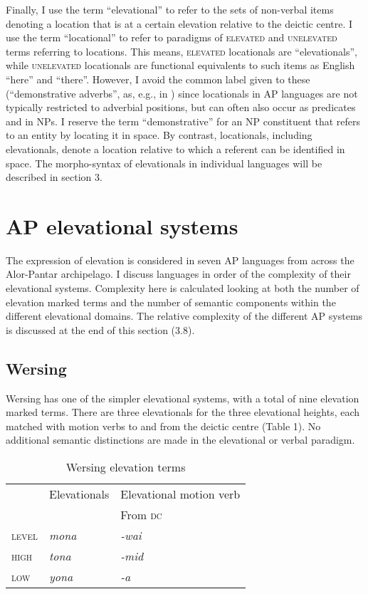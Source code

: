 Finally, I use the term ``elevational'' to refer to the sets of non-verbal items denoting a location that is at a certain elevation relative to the deictic centre. I use the term ``locational'' to refer to paradigms of \textsc{elevated} and \textsc{unelevated} terms referring to locations. This means, \textsc{elevated} locationals are ``elevationals'', while \textsc{unelevated} locationals are functional equivalents to such items as English ``here'' and ``there''. However, I avoid the common label given to these (``demonstrative adverbs'', as, e.g., in \citet{Diessel1999}) since locationals in AP languages are not typically restricted to adverbial positions, but can often also occur as predicates and in NPs. I reserve the term ``demonstrative'' for an NP constituent that refers to an entity by locating it in space. By contrast, locationals, including elevationals, denote a location relative to which a referent can be identified in space. The morpho-syntax of elevationals in individual languages will be described in section 3.

\section{AP elevational systems}
The expression of elevation is considered in seven AP languages from across the Alor-Pantar archipelago. I discuss languages in order of the complexity of their elevational systems. Complexity here is calculated looking at both the number of elevation marked terms and the number of semantic components within the different elevational domains. The relative complexity of the different AP systems is discussed at the end of this section (3.8).

\subsection{Wersing}
Wersing has one of the simpler elevational systems, with a total of nine elevation marked terms. There are three elevationals for the three elevational heights, each matched with motion verbs to and from the deictic centre (Table 1). No additional semantic distinctions are made in the elevational or verbal paradigm.

\begin{table}


\begin{tabular}{lll}
 & Elevationals & Elevational motion verb\\
 &  & From \textsc{dc}\\
{\scshape level} & {\itshape mona} & {\itshape {}-wai}\\
{\scshape high} & {\itshape tona} & {\itshape {}-mid}\\
{\scshape low} & {\itshape yona} & {\itshape {}-a}\\
\end{tabular}

\caption{Wersing elevation terms}
\end{table}

